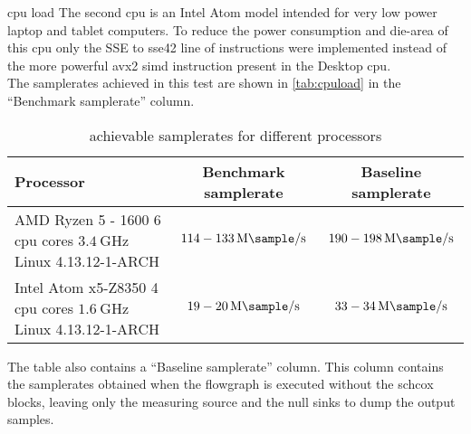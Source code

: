\begin{subchapter}{\Acrshort{cpu} load}
  The second \gls{cpu} is an Intel Atom model intended
  for very low power laptop and tablet computers.
  To reduce the power consumption and die-area
  of this \gls{cpu} only the SSE to \acrshort{sse42} line of
  instructions were implemented instead of the
  more powerful \acrshort{avx2} \acrshort{simd} instruction present
  in the Desktop \gls{cpu}. \\

  The samplerates achieved in this test are shown
  in \autoref{tab:cpuload} in the ``Benchmark samplerate''
  column.

  \begin{table}[H]
    \centering
    \begin{tabular}{| l | c | c |}
      \hline
      Processor & Benchmark samplerate & Baseline samplerate \\

      \hline
      \parbox[c]{5cm}{\vspace{1mm} AMD Ryzen 5 - 1600 \\ 6 \acrshort{cpu} cores \\ $\SI{3.4}{\giga\hertz}$ \\ Linux 4.13.12-1-ARCH \vspace{1mm}} &
      \parbox[c]{5cm}{\centering $114 - \SI{133}{\mega\sample\per\second}$} &
      \parbox[c]{5cm}{\centering $190 - \SI{198}{\mega\sample\per\second}$} \\

      \hline
      \parbox[c]{5cm}{\vspace{1mm} Intel Atom x5-Z8350 \\ 4 \acrshort{cpu} cores \\ $\SI{1.6}{\giga\hertz}$ \\ Linux 4.13.12-1-ARCH \vspace{1mm}} &
      \parbox[c]{5cm}{\centering $19 - \SI{20}{\mega\sample\per\second}$} &
      \parbox[c]{5cm}{\centering $33 - \SI{34}{\mega\sample\per\second}$} \\

      \hline
    \end{tabular}
    \caption{achievable samplerates for different processors}
    \label{tab:cpuload}
  \end{table}

  The table also contains a ``Baseline samplerate'' column.
  This column contains the samplerates obtained when the flowgraph
  is executed without the \gls{schcox} blocks, leaving only
  the measuring source and the null sinks to dump the
  output samples.


\end{subchapter}
